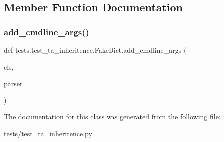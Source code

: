 \subsection{Member Function Documentation}
\mbox{\label{classtests_1_1test__ta__inheritence_1_1FakeDict_a75f0777e5a33a01975af1f8d40b79faa}} 
\subsubsection{\texorpdfstring{add\+\_\+cmdline\+\_\+args()}{add\_cmdline\_args()}}
{\footnotesize\ttfamily def tests.\+test\+\_\+ta\+\_\+inheritence.\+Fake\+Dict.\+add\+\_\+cmdline\+\_\+args (\begin{DoxyParamCaption}\item[{}]{cls,  }\item[{}]{parser }\end{DoxyParamCaption})}



The documentation for this class was generated from the following file\+:\begin{DoxyCompactItemize}
\item 
tests/\hyperlink{test__ta__inheritence_8py}{test\+\_\+ta\+\_\+inheritence.\+py}\end{DoxyCompactItemize}
